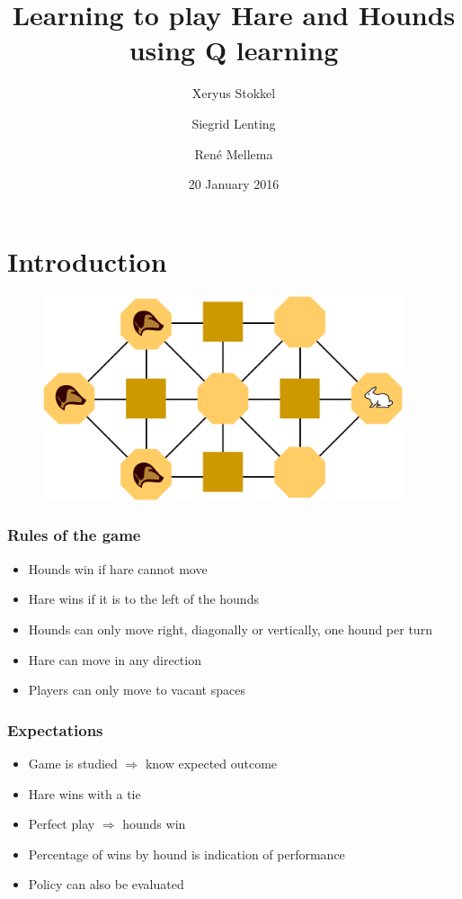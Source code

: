 \documentclass{beamer}
\title{Learning to play Hare and Hounds using Q learning}
\author{Xeryus Stokkel \and Siegrid Lenting \and Ren\'e Mellema}
\date{20 January 2016}
\begin{document}
\begin{frame}
    \maketitle
\end{frame}

\section{Introduction}
\begin{frame}
	\begin{figure}
		\centering
		\includegraphics[width=300pt]{Hare_and_Hounds_board.png}
		\label{fig:Hare_and_Hounds_board}
	\end{figure}		
\end{frame}

\begin{frame}
    \frametitle{Rules of the game}
    \begin{itemize}
        \item Hounds win if hare cannot move
        \item Hare wins if it is to the left of the hounds
        \item Hounds can only move right, diagonally or vertically, one hound per turn
        \item Hare can move in any direction
        \item Players can only move to vacant spaces
    \end{itemize}
\end{frame}

\begin{frame}
    \frametitle{Expectations}
    \begin{itemize}[<+->]
        \item<1-> Game is studied \pause $\Rightarrow$ know expected outcome
        \item<3-> Hare wins with a tie
        \item<4-> Perfect play $\Rightarrow$ hounds win
        \item<5-> Percentage of wins by hound is indication of performance
        \item<6-> Policy can also be evaluated
    \end{itemize}
\end{frame}
\end{document}

